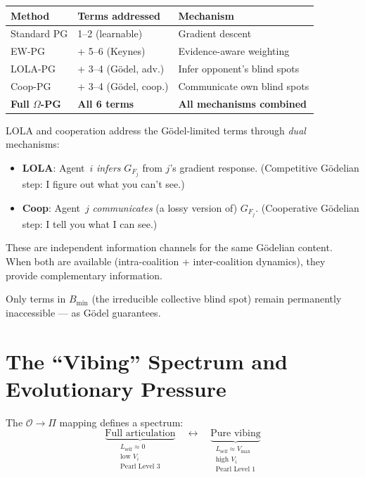 \documentclass[11pt]{article}
\begin{document}
\begin{center}
\begin{tabular}{lll}
\hline
\textbf{Method} & \textbf{Terms addressed} & \textbf{Mechanism} \\
\hline
Standard PG     & 1--2 (learnable)     & Gradient descent \\
EW-PG           & + 5--6 (Keynes)      & Evidence-aware weighting \\
LOLA-PG         & + 3--4 (G\"odel, adv.)  & Infer opponent's blind spots \\
Coop-PG         & + 3--4 (G\"odel, coop.) & Communicate own blind spots \\
\textbf{Full $\Omega$-PG} & \textbf{All 6 terms} & \textbf{All mechanisms combined} \\
\hline
\end{tabular}
\end{center}

LOLA and cooperation address the G\"odel-limited terms through
\emph{dual} mechanisms:
\begin{itemize}
  \item \textbf{LOLA}: Agent~$i$ \emph{infers} $G_{F_j}$ from $j$'s gradient response.
        (Competitive G\"odelian step: I figure out what you can't see.)
  \item \textbf{Coop}: Agent~$j$ \emph{communicates} (a lossy version of) $G_{F_j}$.
        (Cooperative G\"odelian step: I tell you what I can see.)
\end{itemize}
These are independent information channels for the same G\"odelian content.
When both are available (intra-coalition + inter-coalition dynamics),
they provide complementary information.

Only terms in $B_{\min}$ (the irreducible collective blind spot) remain
permanently inaccessible --- as G\"odel guarantees.


\section{The ``Vibing'' Spectrum and Evolutionary Pressure}

The $\mathcal{O} \to \Pi$ mapping defines a spectrum:
\begin{equation*}
  \underbrace{\text{Full articulation}}_{\substack{L_{\text{self}} \approx 0 \\ \text{low } V_i \\ \text{Pearl Level 3}}}
  \quad\longleftrightarrow\quad
  \underbrace{\text{Pure vibing}}_{\substack{L_{\text{self}} \approx V_{\max} \\ \text{high } V_i \\ \text{Pearl Level 1}}}
\end{equation*}
\end{document}
